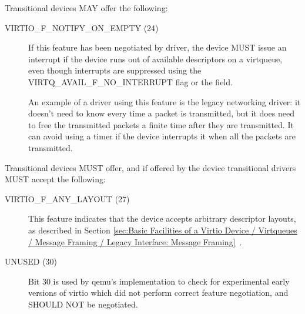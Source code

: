 Transitional devices MAY offer the following:
\begin{description}
\item[VIRTIO_F_NOTIFY_ON_EMPTY (24)] If this feature
  has been negotiated by driver, the device MUST issue
  an interrupt if the device runs
  out of available descriptors on a virtqueue, even though
  interrupts are suppressed using the VIRTQ_AVAIL_F_NO_INTERRUPT
  flag or the  field.
\begin{note}
  An example of a driver using this feature is the legacy
  networking driver: it doesn't need to know every time a packet
  is transmitted, but it does need to free the transmitted
  packets a finite time after they are transmitted. It can avoid
  using a timer if the device interrupts it when all the packets
  are transmitted.
\end{note}
\end{description}

Transitional devices MUST offer, and if offered by the device
transitional drivers MUST accept the following:
\begin{description}
\item[VIRTIO_F_ANY_LAYOUT (27)] This feature indicates that the device
  accepts arbitrary descriptor layouts, as described in Section
  \ref{sec:Basic Facilities of a Virtio Device / Virtqueues / Message Framing / Legacy Interface: Message Framing}~.

\item[UNUSED (30)] Bit 30 is used by qemu's implementation to check
  for experimental early versions of virtio which did not perform
  correct feature negotiation, and SHOULD NOT be negotiated.
\end{description}
